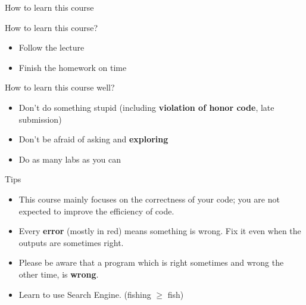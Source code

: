 \begin{frame}
\end{frame}

\begin{frame}{How to learn this course}
\begin{block}{How to learn this course?}
\begin{itemize}
    \item Follow the lecture
    \item Finish the homework on time
\end{itemize}
\end{block}

\begin{block}{How to learn this course well?}
\begin{itemize}
    \item Don't do something stupid (including \textbf{violation of honor code}, late submission)
    \item Don't be afraid of asking and \textbf{exploring}
    \item Do as many labs as you can
\end{itemize}
\end{block}
\end{frame}

\begin{frame}
\begin{block}{Tips}
\begin{itemize}
\item This course mainly focuses on the correctness of your code; you are not expected to improve the efficiency of code.
\item Every \textbf{error} (mostly in red) means something is wrong. Fix it even when the outputs are sometimes right.
\item Please be aware that a program which is right sometimes and wrong the other time, is \textbf{wrong}.
\item Learn to use Search Engine. (fishing $\geq$ fish)
\end{itemize}
\end{block}
\end{frame}

